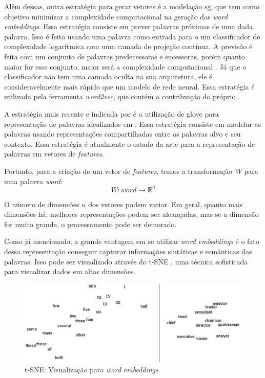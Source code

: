Além dessas, outra estratégia para gerar vetores é a modelação \ac{sg}, que tem como objetivo minimizar a complexidade computacional na geração das \textit{word embeddings}. Essa estratégia consiste em prever palavras próximas de uma dada palavra. Isso é feito usando uma palavra como entrada para o um classificador de complexidade logarítmica com uma camada de projeção contínua. A previsão é feita com um conjunto de palavras predecessoras e sucessoras, porém quanto maior for esse conjunto, maior será a complexidade computacional \cite{mikolov2013efficient}. Já que o classificador não tem uma camada oculta na sua arquitetura, ele é consideravelmente mais rápido que um modelo de rede neural. Essa estratégia é utilizada pela ferramenta \textit{word2vec}, que contém a contribuição do próprio .

A estratégia mais recente e indicada por  é a utilização de \ac{glove} para representação de palavras idealizados em \cite{pennington2014glove}. Essa estratégia consiste em modelar as palavras usando representações compartilhadas entre as palavras alvo e seu contexto. Essa estratégia é atualmente o estado da arte para a representação de palavras em vetores de \textit{features}.

Portanto, para a criação de um vetor de \textit{features}, temos a transformação \textit{W} para uma palavra \textit{word}:
\begin{equation}
W:word \to \mathbb{R}^n
\end{equation}

O número de dimensões $n$ dos vetores podem variar. Em geral, quanto mais dimensões há, melhores representações podem ser alcançadas, mas se a dimensão for muito grande, o processamento pode ser demorado.

Como já mencionado, a grande vantagem em se utilizar \textit{word embeddings} é o fato dessa representação conseguir capturar informações sintáticas e semânticas das palavras. Isso pode ser visualizado através do t-SNE \cite{van2008visualizing}, uma técnica sofisticada para visualizar dados em altas dimensões.

\begin{figure}[htb]
  \caption{t-SNE: Visualização para \textit{word embeddings}}\label{fig:wordtsne}
  \begin{center}
      \includegraphics[scale=0.25]{img/Turian-WordTSNE}
  \end{center}
\end{figure}

